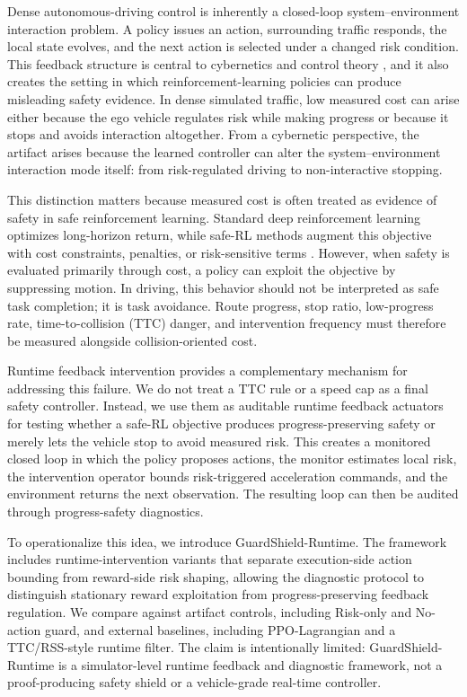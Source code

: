 \documentclass[pdflatex,sn-mathphys-ay]{sn-jnl}
\begin{document}
Dense autonomous-driving control is inherently a closed-loop system--environment interaction problem. A policy issues an action, surrounding traffic responds, the local state evolves, and the next action is selected under a changed risk condition. This feedback structure is central to cybernetics and control theory \citep{wiener1948cybernetics,astrom2008feedback}, and it also creates the setting in which reinforcement-learning policies can produce misleading safety evidence. In dense simulated traffic, low measured cost can arise either because the ego vehicle regulates risk while making progress or because it stops and avoids interaction altogether. From a cybernetic perspective, the artifact arises because the learned controller can alter the system--environment interaction mode itself: from risk-regulated driving to non-interactive stopping.

This distinction matters because measured cost is often treated as evidence of safety in safe reinforcement learning. Standard deep reinforcement learning optimizes long-horizon return, while safe-RL methods augment this objective with cost constraints, penalties, or risk-sensitive terms \citep{altman1999constrained,garcia2015safe,achiam2017constrained,chow2018lyapunov}. However, when safety is evaluated primarily through cost, a policy can exploit the objective by suppressing motion. In driving, this behavior should not be interpreted as safe task completion; it is task avoidance. Route progress, stop ratio, low-progress rate, time-to-collision (TTC) danger, and intervention frequency must therefore be measured alongside collision-oriented cost.

Runtime feedback intervention provides a complementary mechanism for addressing this failure. We do not treat a TTC rule or a speed cap as a final safety controller. Instead, we use them as auditable runtime feedback actuators for testing whether a safe-RL objective produces progress-preserving safety or merely lets the vehicle stop to avoid measured risk. This creates a monitored closed loop in which the policy proposes actions, the monitor estimates local risk, the intervention operator bounds risk-triggered acceleration commands, and the environment returns the next observation. The resulting loop can then be audited through progress-safety diagnostics.

To operationalize this idea, we introduce GuardShield-Runtime. The framework includes runtime-intervention variants that separate execution-side action bounding from reward-side risk shaping, allowing the diagnostic protocol to distinguish stationary reward exploitation from progress-preserving feedback regulation. We compare against artifact controls, including Risk-only and No-action guard, and external baselines, including PPO-Lagrangian and a TTC/RSS-style runtime filter. The claim is intentionally limited: GuardShield-Runtime is a simulator-level runtime feedback and diagnostic framework, not a proof-producing safety shield or a vehicle-grade real-time controller.
\end{document}
